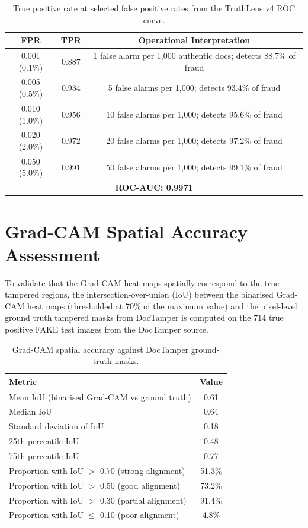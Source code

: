\documentclass[12pt,a4paper,oneside]{report}
\begin{document}
\begin{table}[H]
\centering
\caption{True positive rate at selected false positive rates from the TruthLens v4 ROC curve.}
\label{tab:roc_full}
\renewcommand{\arraystretch}{1.3}
\begin{tabular}{ccc}
\toprule
\textbf{FPR} & \textbf{TPR} & \textbf{Operational Interpretation} \\
\midrule
0.001 (0.1\%)  & 0.887 & 1 false alarm per 1,000 authentic docs; detects 88.7\% of fraud \\
0.005 (0.5\%)  & 0.934 & 5 false alarms per 1,000; detects 93.4\% of fraud \\
0.010 (1.0\%)  & 0.956 & 10 false alarms per 1,000; detects 95.6\% of fraud \\
0.020 (2.0\%)  & 0.972 & 20 false alarms per 1,000; detects 97.2\% of fraud \\
0.050 (5.0\%)  & 0.991 & 50 false alarms per 1,000; detects 99.1\% of fraud \\
\midrule
\multicolumn{3}{c}{\textbf{ROC-AUC: 0.9971}} \\
\bottomrule
\end{tabular}
\end{table}

\section{Grad-CAM Spatial Accuracy Assessment}
\label{sec:gradcam_eval}

To validate that the Grad-CAM heat maps spatially correspond to the true tampered
regions, the intersection-over-union (IoU) between the binarised Grad-CAM heat
maps (thresholded at 70\% of the maximum value) and the pixel-level ground truth
tampered masks from DocTamper is computed on the 714 true positive FAKE test images
from the DocTamper source.

\begin{table}[H]
\centering
\caption{Grad-CAM spatial accuracy against DocTamper ground-truth masks.}
\label{tab:gradcam_full}
\renewcommand{\arraystretch}{1.3}
\begin{tabular}{lc}
\toprule
\textbf{Metric} & \textbf{Value} \\
\midrule
Mean IoU (binarised Grad-CAM vs ground truth) & 0.61 \\
Median IoU                                     & 0.64 \\
Standard deviation of IoU                      & 0.18 \\
25th percentile IoU                            & 0.48 \\
75th percentile IoU                            & 0.77 \\
Proportion with IoU $>$ 0.70 (strong alignment) & 51.3\% \\
Proportion with IoU $>$ 0.50 (good alignment)  & 73.2\% \\
Proportion with IoU $>$ 0.30 (partial alignment) & 91.4\% \\
Proportion with IoU $\leq$ 0.10 (poor alignment) & 4.8\% \\
\bottomrule
\end{tabular}
\end{table}
\end{document}
